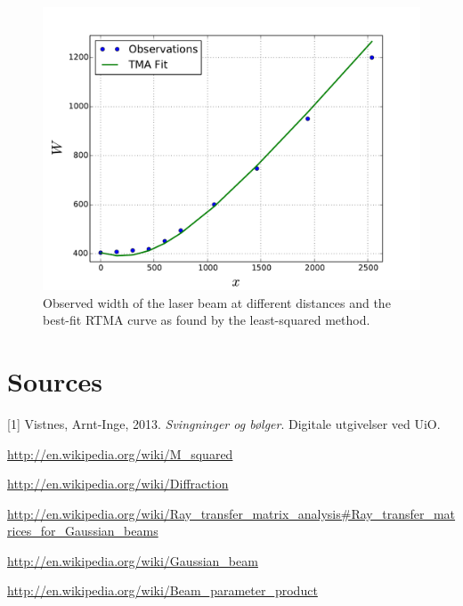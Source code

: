 \documentclass[a4paper, 11pt, notitlepage, english]{article}
\begin{document}
\begin{figure}[htpb]
\includegraphics[width=\textwidth]{fig1.pdf}	
\caption{Observed width of the laser beam at different distances and the best-fit RTMA curve as found by the least-squared method.}
\end{figure}





\clearpage


\section{Sources} 

[1] Vistnes, Arnt-Inge, 2013. \emph{Svingninger og bølger}. Digitale utgivelser ved UiO.

\url{http://en.wikipedia.org/wiki/M_squared}

\url{http://en.wikipedia.org/wiki/Diffraction}

\url{http://en.wikipedia.org/wiki/Ray_transfer_matrix_analysis#Ray_transfer_matrices_for_Gaussian_beams}

\url{http://en.wikipedia.org/wiki/Gaussian_beam}

\url{http://en.wikipedia.org/wiki/Beam_parameter_product}
\section{}
\end{document}
